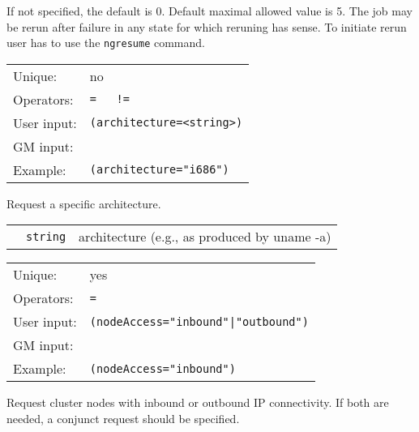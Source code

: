   If not specified, the default is 0. Default maximal allowed value is
  5. The job may be rerun after failure in any state for which reruning 
  has sense. To initiate rerun user has to use the \texttt{ngresume} command.

  \hspace*{0.5cm}
  \begin{shaded}
  \end{shaded}
  \begin{tabular}{lp{13cm}}
    Unique:&no\\
    Operators:&\verb#=   !=#\\
    User input:&\verb#(architecture=<string>)#\\
    GM input:&\\
    Example:&\verb#(architecture="i686")#\\
  \end{tabular}

  Request a specific architecture.

  \begin{tabular}{llp{10cm}}
    \hspace*{1cm}&\texttt{string} & architecture  (e.g., as produced by uname -a)\\
  \end{tabular}

  \hspace*{0.5cm}
  \begin{shaded}
  \end{shaded}
  \begin{tabular}{lp{13cm}}
    Unique:&yes\\
    Operators:&\verb#=#\\
    User input:&\verb#(nodeAccess="inbound"|"outbound")#\\
    GM input:&\\
    Example:&\verb#(nodeAccess="inbound")#\\
  \end{tabular}

  Request cluster nodes with inbound or outbound IP connectivity. If
  both are needed, a conjunct request should be specified.

